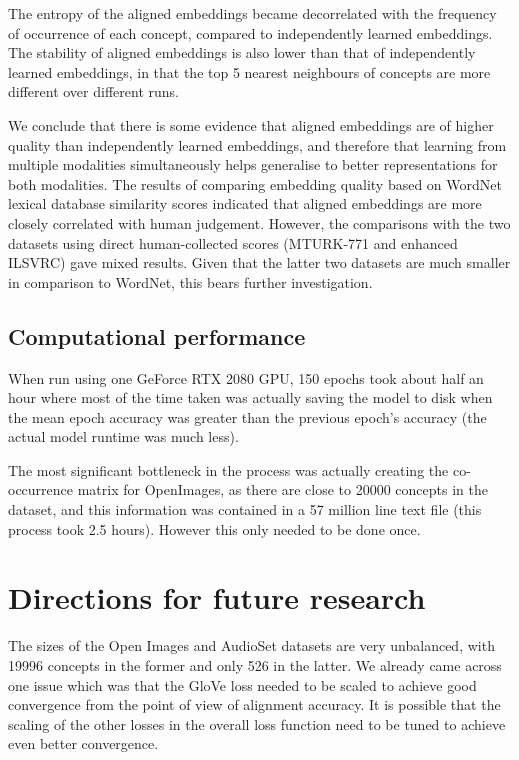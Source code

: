 The entropy of the aligned embeddings became decorrelated with the frequency of occurrence of each concept, compared to independently learned embeddings. The stability of aligned embeddings is also lower than that of independently learned embeddings, in that the top 5 nearest neighbours of concepts are more different over different runs.

We conclude that there is some evidence that aligned embeddings are of higher quality than independently learned embeddings, and therefore that learning from multiple modalities simultaneously helps generalise to better representations for both modalities. The results of comparing embedding quality based on WordNet lexical database similarity scores indicated that aligned embeddings are more closely correlated with human judgement. However, the comparisons with the two datasets using direct human-collected scores (MTURK-771 and enhanced ILSVRC) gave mixed results. Given that the latter two datasets are much smaller in comparison to WordNet, this bears further investigation. 

\subsection{Computational performance}

When run using one GeForce RTX 2080 GPU, 150 epochs took about half an hour where most of the time taken was actually saving the model to disk when the mean epoch accuracy was greater than the previous epoch's accuracy (the actual model runtime was much less). 

The most significant bottleneck in the process was actually creating the co-occurrence matrix for OpenImages, as there are close to 20000 concepts in the dataset, and this information was contained in a 57 million line text file (this process took 2.5 hours). However this only needed to be done once.

\section{Directions for future research}

The sizes of the Open Images and AudioSet datasets are very unbalanced, with 19996 concepts in the former and only 526 in the latter. We already came across one issue which was that the GloVe loss needed to be scaled to achieve good convergence from the point of view of alignment accuracy. It is possible that the scaling of the other losses in the overall loss function need to be tuned to achieve even better convergence. 

